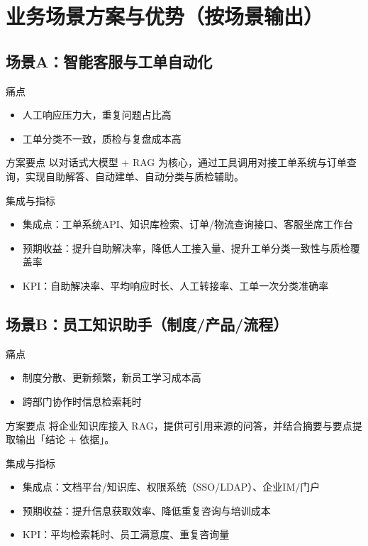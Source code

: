 \documentclass[UTF8,a4paper,11pt,fontset=fandol]{ctexart}
\begin{document}
\section{业务场景方案与优势（按场景输出）}
\subsection{场景A：智能客服与工单自动化}
\begin{infobox}{痛点}
\begin{itemize}[leftmargin=2.2em]
  \item 人工响应压力大，重复问题占比高
  \item 工单分类不一致，质检与复盘成本高
\end{itemize}
\end{infobox}
\begin{infobox}{方案要点}
以对话式大模型 + RAG 为核心，通过工具调用对接工单系统与订单查询，实现自助解答、自动建单、自动分类与质检辅助。
\end{infobox}
\begin{infobox}{集成与指标}
\begin{itemize}[leftmargin=2.2em]
  \item 集成点：工单系统API、知识库检索、订单/物流查询接口、客服坐席工作台
  \item 预期收益：提升自助解决率，降低人工接入量、提升工单分类一致性与质检覆盖率
  \item KPI：自助解决率、平均响应时长、人工转接率、工单一次分类准确率
\end{itemize}
\end{infobox}

\subsection{场景B：员工知识助手（制度/产品/流程）}
\begin{infobox}{痛点}
\begin{itemize}[leftmargin=2.2em]
  \item 制度分散、更新频繁，新员工学习成本高
  \item 跨部门协作时信息检索耗时
\end{itemize}
\end{infobox}
\begin{infobox}{方案要点}
将企业知识库接入 RAG，提供可引用来源的问答，并结合摘要与要点提取输出「结论 + 依据」。
\end{infobox}
\begin{infobox}{集成与指标}
\begin{itemize}[leftmargin=2.2em]
  \item 集成点：文档平台/知识库、权限系统（SSO/LDAP）、企业IM/门户
  \item 预期收益：提升信息获取效率、降低重复咨询与培训成本
  \item KPI：平均检索耗时、员工满意度、重复咨询量
\end{itemize}
\end{infobox}
\end{document}
